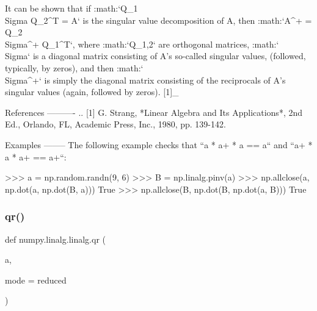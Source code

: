 \begin{DoxyVerb}
It can be shown that if :math:`Q_1 \\Sigma Q_2^T = A` is the singular
value decomposition of A, then
:math:`A^+ = Q_2 \\Sigma^+ Q_1^T`, where :math:`Q_{1,2}` are
orthogonal matrices, :math:`\\Sigma` is a diagonal matrix consisting
of A's so-called singular values, (followed, typically, by
zeros), and then :math:`\\Sigma^+` is simply the diagonal matrix
consisting of the reciprocals of A's singular values
(again, followed by zeros). [1]_

References
----------
.. [1] G. Strang, *Linear Algebra and Its Applications*, 2nd Ed., Orlando,
       FL, Academic Press, Inc., 1980, pp. 139-142.

Examples
--------
The following example checks that ``a * a+ * a == a`` and
``a+ * a * a+ == a+``:

>>> a = np.random.randn(9, 6)
>>> B = np.linalg.pinv(a)
>>> np.allclose(a, np.dot(a, np.dot(B, a)))
True
>>> np.allclose(B, np.dot(B, np.dot(a, B)))
True\end{DoxyVerb}
 \mbox{\label{namespacenumpy_1_1linalg_1_1linalg_a4ddd53f396f7bd38fafbdd8488616687}} 
\subsubsection{\texorpdfstring{qr()}{qr()}}
{\footnotesize\ttfamily def numpy.\+linalg.\+linalg.\+qr (\begin{DoxyParamCaption}\item[{}]{a,  }\item[{}]{mode = {\ttfamily \textquotesingle{}reduced\textquotesingle{}} }\end{DoxyParamCaption})}

